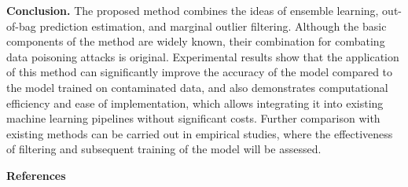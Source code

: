 \begin{multicols}{2}
{\bfseries Conclusion.} The proposed method combines the ideas of ensemble
learning, out-of-bag prediction estimation, and marginal outlier
filtering. Although the basic components of the method are widely known,
their combination for combating data poisoning attacks is original.
Experimental results show that the application of this method can
significantly improve the accuracy of the model compared to the model
trained on contaminated data, and also demonstrates computational
efficiency and ease of implementation, which allows integrating it into
existing machine learning pipelines without significant costs. Further
comparison with existing methods can be carried out in empirical
studies, where the effectiveness of filtering and subsequent training of
the model will be assessed.
\end{multicols}

\begin{center}
{\bfseries References}
\end{center}

